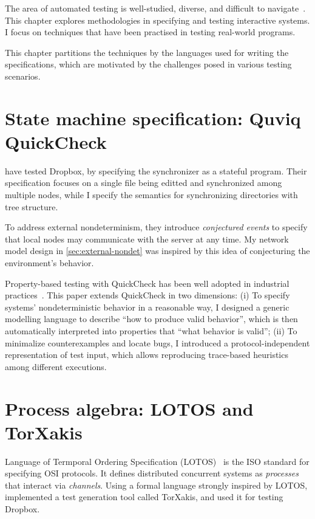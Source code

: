 The area of automated testing is well-studied, diverse, and difficult to
navigate~\cite{anand2013orchestrated}.  This chapter explores methodologies in
specifying and testing interactive systems.  I focus on techniques that have
been practised in testing real-world programs.

This chapter partitions the techniques by the languages used for writing the
specifications, which are motivated by the challenges posed in various testing
scenarios.

\section{State machine specification: Quviq QuickCheck}
\citet{testing-dropbox} have tested Dropbox, by specifying the synchronizer as a
stateful program.  Their specification focuses on a single file being editted
and synchronized among multiple nodes, while I specify the semantics for
synchronizing directories with tree structure.

To address external nondeterminism, they introduce {\em conjectured events} to
specify that local nodes may communicate with the server at any time.  My
network model design in \autoref{sec:external-nondet} was inspired by this idea
of conjecturing the environment's behavior.

Property-based testing with QuickCheck has been well adopted in industrial
practices~\cite{Hughes2016}.  This paper extends QuickCheck in two dimensions:
(i) To specify systems' nondeterministic behavior in a reasonable way, I
designed a generic modelling language to describe ``how to produce valid
behavior'', which is then automatically interpreted into properties that ``what
behavior is valid''; (ii) To minimalize counterexamples and locate bugs, I
introduced a protocol-independent representation of test input, which allows
reproducing trace-based heuristics among different executions.

\section{Process algebra: LOTOS and TorXakis}
Language of Termporal Ordering Specification (LOTOS)~\cite{lotos} is the ISO
standard for specifying OSI protocols.  It defines distributed concurrent
systems as {\em processes} that interact via {\em channels}.  Using a formal
language strongly inspired by LOTOS, \citet{torxakis-dropbox} implemented a test
generation tool called TorXakis, and used it for testing Dropbox.

